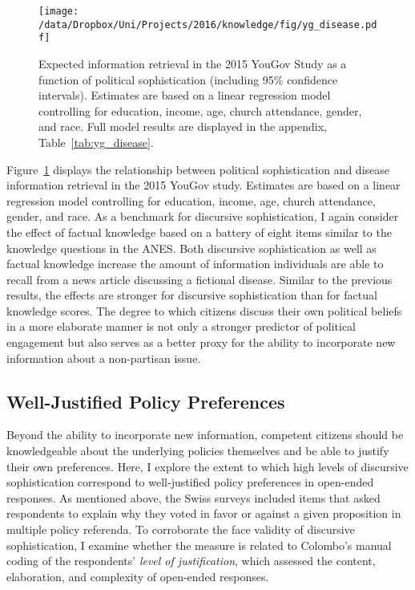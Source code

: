 \begin{figure}[h]\centering
\texttt{[image: /data/Dropbox/Uni/Projects/2016/knowledge/fig/yg\_disease.pdf]}
\caption[Expected information retrieval in the 2015 YouGov Study as a function of political sophistication]{Expected information retrieval in the 2015 YouGov Study as a function of political sophistication (including 95\% confidence intervals). Estimates are based on a linear regression model controlling for education, income, age, church attendance, gender, and race. Full model results are displayed in the appendix, Table~\ref{tab:yg_disease}.}\label{fig:yg_disease}
\end{figure}

Figure~\ref{fig:yg_disease} displays the relationship between political sophistication and disease information retrieval in the 2015 YouGov study. Estimates are based on a linear regression model controlling for education, income, age, church attendance, gender, and race. As a benchmark for discursive sophistication, I again consider the effect of factual knowledge based on a battery of eight items similar to the knowledge questions in the ANES. Both discursive sophistication as well as factual knowledge increase the amount of information individuals are able to recall from a news article discussing a fictional disease. Similar to the previous results, the effects are stronger for discursive sophistication than for factual knowledge scores. The degree to which citizens discuss their own political beliefs in a more elaborate manner is not only a stronger predictor of political engagement but also serves as a better proxy for the ability to incorporate new information about a non-partisan issue.


\subsection*{Well-Justified Policy Preferences}
Beyond the ability to incorporate new information, competent citizens should be knowledgeable about the underlying policies themselves and be able to justify their own preferences. Here, I explore the extent to which high levels of discursive sophistication correspond to well-justified policy preferences in open-ended responses. As mentioned above, the Swiss surveys included items that asked respondents to explain why they voted in favor or against a given proposition in multiple policy referenda. To corroborate the face validity of discursive sophistication, I examine whether the measure is related to Colombo's \citeyearpar{colombo2016justifications} manual coding of the respondents' \textit{level of justification}, which assessed the content, elaboration, and complexity of open-ended responses.

